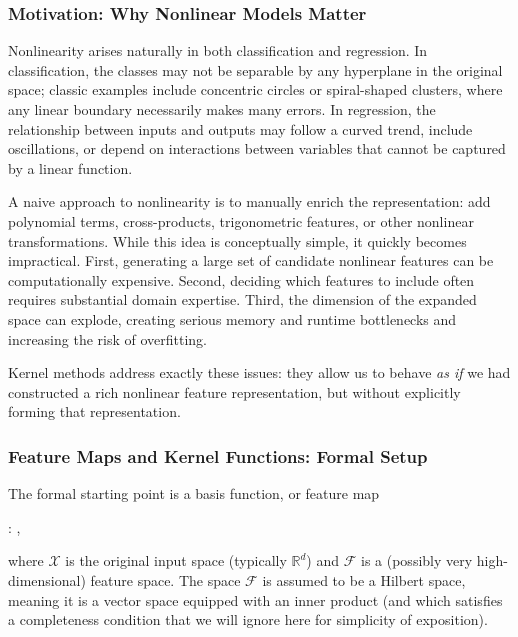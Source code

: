 \medskip

\subsubsection*{Motivation: Why Nonlinear Models Matter}

Nonlinearity arises naturally in both classification and regression. In classification, the classes may not be separable by any hyperplane in the original space; classic examples include concentric circles or spiral-shaped clusters, where any linear boundary necessarily makes many errors. In regression, the relationship between inputs and outputs may follow a curved trend, include oscillations, or depend on interactions between variables that cannot be captured by a linear function.

A naive approach to nonlinearity is to manually enrich the representation: add polynomial terms, cross-products, trigonometric features, or other nonlinear transformations. While this idea is conceptually simple, it quickly becomes impractical. First, generating a large set of candidate nonlinear features can be computationally expensive. Second, deciding which features to include often requires substantial domain expertise. Third, the dimension of the expanded space can explode, creating serious memory and runtime bottlenecks and increasing the risk of overfitting.

Kernel methods address exactly these issues: they allow us to behave \emph{as if} we had constructed a rich nonlinear feature representation, but without explicitly forming that representation.

\medskip

\subsubsection*{Feature Maps and Kernel Functions: Formal Setup}

The formal starting point is a basis function, or \alert{feature map} 
\begin{myequation*}
\boldsymbol{\phi}:  \to {},
\end{myequation*}
where $\mathcal{X}$ is the original input space (typically $\mathbb{R}^d$) and $\mathcal{F}$ is a (possibly very high-dimensional) \alert{feature space}. The space $\mathcal{F}$ is assumed to be a \alert{Hilbert space}, meaning it is a vector space equipped with an inner product (and which satisfies  a completeness condition that we will ignore here for simplicity of exposition). 

